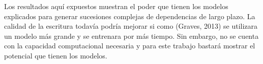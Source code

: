 \vspace{3em}

Los resultados aquí expuestos muestran el poder que tienen los modelos explicados para generar sucesiones complejas de dependencias de largo plazo. La calidad de la escritura todavía podría mejorar si como (Graves, 2013) se utilizara un modelo más grande y se entrenara por más tiempo. Sin embargo, no se cuenta con la capacidad computacional necesaria y para este trabajo bastará mostrar el potencial que tienen los modelos.
\cite{DBLP:journals/corr/Graves13}
